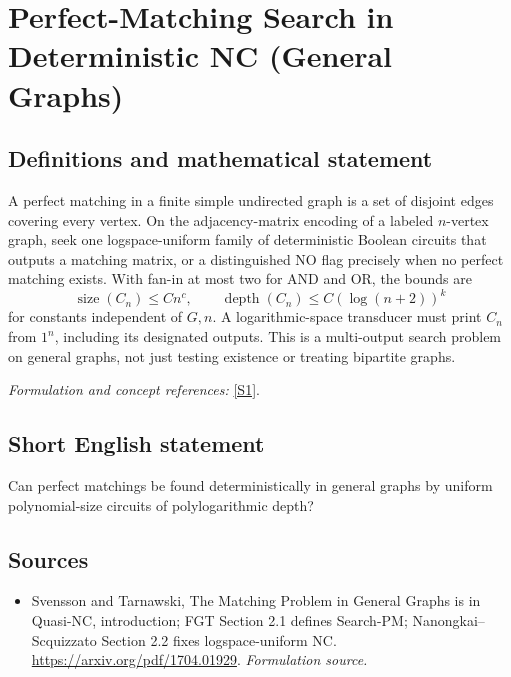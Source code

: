 \documentclass[11pt]{article}
\begin{document}
\section*{\texorpdfstring{Perfect-Matching Search in Deterministic NC (General Graphs)}{Perfect-Matching Search in Deterministic NC (General Graphs)}}\label{227}
\subsection{Definitions and mathematical statement}
A perfect matching in a finite simple undirected graph is a set of disjoint edges covering every vertex. On the adjacency-matrix encoding of a labeled $n$-vertex graph, seek one logspace-uniform family of deterministic Boolean circuits that outputs a matching matrix, or a distinguished NO flag precisely when no perfect matching exists. With fan-in at most two for AND and OR, the bounds are
\[
 \operatorname{size}(C_n)\le Cn^c,\qquad
 \operatorname{depth}(C_n)\le C(\log(n+2))^k
\]
for constants independent of $G,n$. A logarithmic-space transducer must print $C_n$ from $1^n$, including its designated outputs. This is a multi-output search problem on general graphs, not just testing existence or treating bipartite graphs.
\par\smallskip\textit{Formulation and concept references:} \href{https://arxiv.org/pdf/1704.01929}{[S1]}.

\subsection{Short English statement}
Can perfect matchings be found deterministically in general graphs by uniform polynomial-size circuits of polylogarithmic depth?
\subsection{Sources}
\begin{itemize}
\item[S1]Svensson and Tarnawski, The Matching Problem in General Graphs is in Quasi-NC, introduction; FGT Section 2.1 defines Search-PM; Nanongkai–Scquizzato Section 2.2 fixes logspace-uniform NC.
\url{https://arxiv.org/pdf/1704.01929}.
\textit{Formulation source.}
\end{itemize}
\end{document}
